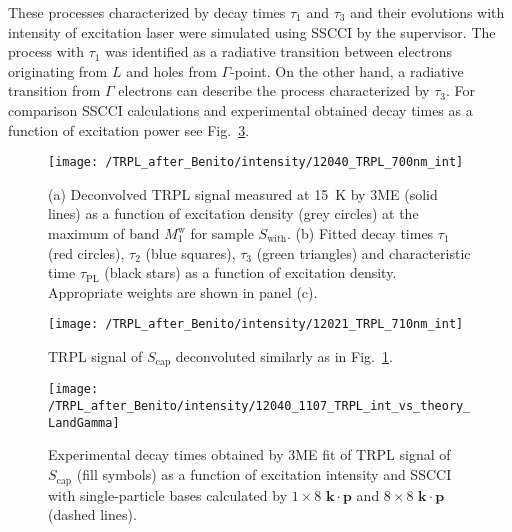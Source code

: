 These processes characterized by decay times $\tau_1$ and $\tau_3$ and their evolutions with intensity of excitation laser were simulated using SSCCI by the supervisor. The process with $\tau_1$ was identified as a radiative transition between electrons originating from $L$ and holes from $\Gamma$-point. On the other hand, a radiative transition from $\Gamma$ electrons can describe the process characterized by $\tau_3$. For comparison SSCCI calculations and experimental obtained decay times as a function of excitation power see Fig.~\ref{fig:TRPL_int_c_theory}.
\begin{figure}
	\centering
	\texttt{[image: /TRPL\_after\_Benito/intensity/12040\_TRPL\_700nm\_int]}
	\caption{(a) Deconvolved TRPL signal measured at 15~K by 3ME (solid lines) as a function of excitation density (grey circles) at the maximum of band $M_1^\mathrm{w}$ for sample $S_\mathrm{with}$. (b) Fitted decay times $\tau_1$ (red circles), $\tau_2$ (blue squares), $\tau_3$ (green triangles) and characteristic time $\tau_\mathrm{PL}$ (black stars) as a function of excitation density. Appropriate weights are shown in panel (c).}
	\label{fig:TRPL_int_w}
\end{figure}

\begin{figure}
	\centering
	\texttt{[image: /TRPL\_after\_Benito/intensity/12021\_TRPL\_710nm\_int]}
	\caption{TRPL signal of $S_\mathrm{cap}$ deconvoluted similarly as in Fig.~\ref{fig:TRPL_int_w}.}
	\label{fig:TRPL_int_c}
\end{figure}


\begin{figure}
	\centering
	\texttt{[image: /TRPL\_after\_Benito/intensity/12040\_1107\_TRPL\_int\_vs\_theory\_LandGamma]}
	\caption{Experimental decay times obtained by 3ME fit of TRPL signal of $S_\mathrm{cap}$ (fill symbols) as a function of excitation intensity and SSCCI with single-particle bases calculated by $1\times8$ $\mathbf{k\cdot p}$ and $8\times8$ $\mathbf{k\cdot p}$ (dashed lines).}
	\label{fig:TRPL_int_c_theory}
\end{figure}


\newpage
